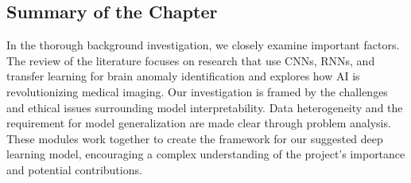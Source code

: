 \subsection{Summary of the Chapter}
In the thorough background investigation, we closely examine important factors. The review of the literature focuses on research that use CNNs, RNNs, and transfer learning for brain anomaly identification and explores how AI is revolutionizing medical imaging. Our investigation is framed by the challenges and ethical issues surrounding model interpretability. Data heterogeneity and the requirement for model generalization are made clear through problem analysis. These modules work together to create the framework for our suggested deep learning model, encouraging a complex understanding of the project's importance and potential contributions.